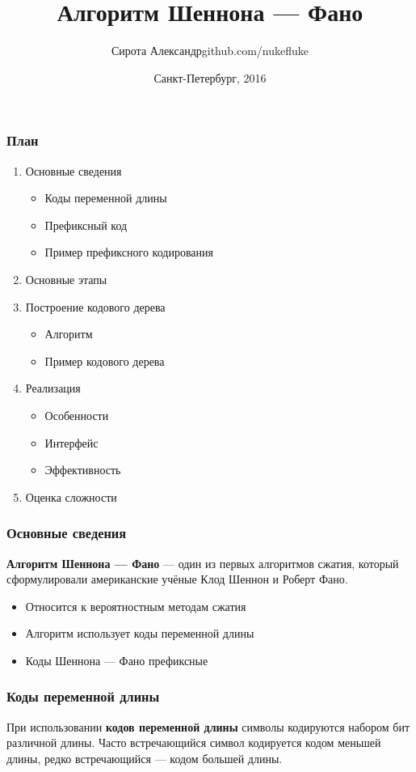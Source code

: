 \documentclass[10pt,pdf,hyperref={unicode}]{beamer}
\title{Алгоритм Шеннона --- Фано}
\author{Сирота Александр\newline\scriptsize github.com/nukefluke}
\institute{\normalsize{ГУАП} \\ \scriptsize{5 факультет \\ Группа 5511}}
\date[3pt]{\scriptsize{Санкт-Петербург, 2016}}
\begin{document}
\begin{frame}
	\titlepage
\end{frame}

\begin{frame}
	\frametitle{План}

	\begin{enumerate}
		\item Основные сведения
		\begin{itemize}
			\item Коды переменной длины
			\item Префиксный код
			\item Пример префиксного кодирования
		\end{itemize}
		\item Основные этапы
		\item Построение кодового дерева
		\begin{itemize}
			\item Алгоритм
			\item Пример кодового дерева
		\end{itemize}
		\item Реализация
		\begin{itemize}
			\item Особенности
			\item Интерфейс
			\item Эффективность
		\end{itemize}
		\item Оценка сложности
	\end{enumerate}
\end{frame}

\begin{frame}
	\frametitle{Основные сведения}
	\textbf{Алгоритм Шеннона --- Фано} --- один из первых алгоритмов 
	сжатия, который сформулировали американские учёные Клод Шеннон и Роберт 
	Фано.
	\begin{itemize}
		\item Относится к вероятностным методам сжатия
		\item Алгоритм использует коды переменной длины
		\item Коды Шеннона --- Фано префиксные
	\end{itemize}
\end{frame}

\begin{frame}
	\frametitle{Коды переменной длины}
	При использовании \textbf{кодов переменной длины} символы кодируются набором бит различной длины.
	Часто встречающийся символ кодируется кодом меньшей длины, редко встречающийся --- кодом большей длины.
\end{frame}
\end{document}
